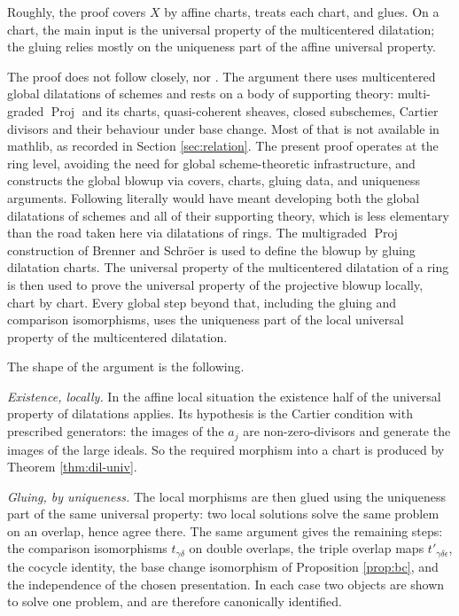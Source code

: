 \documentclass[pdflatex,sn-mathphys-num]{sn-jnl}
\theoremstyle{plain}
\theoremstyle{definition}
\newcommand{\Proj}{\operatorname{Proj}}
\begin{document}
Roughly, the proof covers $X$ by affine charts, treats each chart, and glues.
On a chart, the main input is the universal property of the multicentered
dilatation; the gluing relies mostly on the uniqueness part of the affine
universal property.

The proof does not follow \cite{mayeux-riche} closely, nor \cite{mayeux-dilatations-v4}. The argument there uses
multicentered global dilatations of schemes and rests on a body of supporting
theory: multi-graded $\Proj$ and its charts, quasi-coherent sheaves, closed
subschemes, Cartier divisors and their behaviour under base change. Most of that
is not available in mathlib, as recorded in Section \ref{sec:relation}. The
present proof operates at the ring level, avoiding the need for global scheme-theoretic infrastructure, and constructs the global blowup
via covers, charts, gluing data, and uniqueness arguments. Following
\cite{mayeux-riche} literally would have meant developing both the global
dilatations of schemes and all of their supporting theory, which is less
elementary than the road taken here via dilatations of rings. The multigraded
$\Proj$ construction of Brenner and Schröer \cite{brenner-schroer} is used to
define the blowup by gluing dilatation charts. The universal property of the
multicentered dilatation of a ring is then used to prove the universal property
of the projective blowup locally, chart by chart. Every global step
beyond that, including the gluing and comparison isomorphisms, uses the
uniqueness part of the local universal property of the multicentered dilatation.

The shape of the argument is the following.

\emph{Existence, locally.} In the affine local situation the existence half of
the universal property of dilatations applies. Its hypothesis is the Cartier
condition with prescribed generators: the images of the $a_j$ are
non-zero-divisors and generate the images of the large ideals. So
the required morphism into a chart is produced by Theorem \ref{thm:dil-univ}.

\emph{Gluing, by uniqueness.} The local morphisms are then glued using the
uniqueness part of the same universal property: two local solutions solve the
same problem on an overlap, hence agree there. The same
argument gives the remaining steps: the comparison
isomorphisms $t_{\gamma\delta}$ on double overlaps, the triple overlap maps
$t'_{\gamma\delta\epsilon}$, the cocycle identity, the base change isomorphism
of Proposition \ref{prop:bc}, and the independence of the chosen presentation.
In each case two objects are shown to solve one problem, and are therefore
canonically identified.
\end{document}
